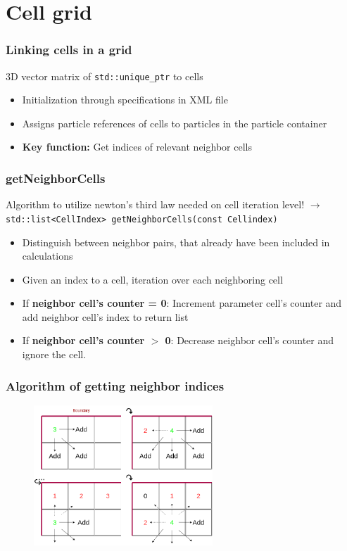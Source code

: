 
\section{Cell grid}
\label{sec:grid}

\begin{frame}
    \frametitle{Linking cells in a grid}
    3D vector matrix of \texttt{std::unique\_ptr} to cells
    \begin{itemize}
        \item Initialization through specifications in XML file
        \item Assigns particle references of cells to particles in the particle container
        \item \textbf{Key function:} Get indices of relevant neighbor cells
    \end{itemize}
\end{frame}

\begin{frame}
    \frametitle{getNeighborCells}
    Algorithm to utilize newton's third law needed on cell iteration level!\newline
    $\longrightarrow$ \texttt{std::list<CellIndex> getNeighborCells(const Cellindex)}
    \begin{itemize}
        \item Distinguish between neighbor pairs, that already have been included in calculations
        \item Given an index to a cell, iteration over each neighboring cell
        \item If \textbf{neighbor cell's counter = 0}: Increment parameter cell's counter and add neighbor cell's index to return list
        \item If \textbf{neighbor cell's counter $>$ 0}: Decrease neighbor cell's counter and ignore the cell.
    \end{itemize}
\end{frame}

\begin{frame}
    \frametitle{Algorithm of getting neighbor indices}
    \begin{figure}
        \label{fig:neighbor}
        \includegraphics[width=0.6\textwidth]{../../res/getNeighbor.drawio}
    \end{figure}
\end{frame}

